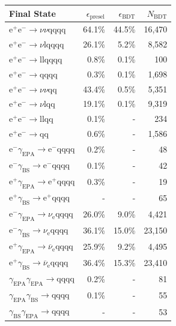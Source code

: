 \begin{table}[h!]
\centering
\begin{tabular}{ l r r r }
\hline
Final State & $\epsilon_{\text{presel}}$ & $\epsilon_{\text{BDT}}$ & $N_{\text{BDT}}$ \\ 
\hline
$\text{e}^{+}\text{e}^{-} \rightarrow \nu{\nu}\text{qqqq}$ & 64.1\% & 44.5\% & 16,470 \\
$\text{e}^{+}\text{e}^{-} \rightarrow \nu\text{lqqqq}$ & 26.1\% & 5.2\% & 8,582 \\
$\text{e}^{+}\text{e}^{-} \rightarrow \text{llqqqq}$ & 0.8\% & 0.1\% & 100 \\
$\text{e}^{+}\text{e}^{-} \rightarrow \text{qqqq}$ & 0.3\% & 0.1\% & 1,698 \\
$\text{e}^{+}\text{e}^{-} \rightarrow \nu{\nu}\text{qq}$ & 43.4\% & 0.5\% & 5,351 \\
$\text{e}^{+}\text{e}^{-} \rightarrow \nu\text{lqq}$ & 19.1\% & 0.1\% & 9,319 \\
$\text{e}^{+}\text{e}^{-} \rightarrow \text{llqq}$ & 0.1\% & - & 234 \\
$\text{e}^{+}\text{e}^{-} \rightarrow \text{qq}$ & 0.6\% & - & 1,586 \\
$\text{e}^{-}\gamma_{\text{EPA}} \rightarrow \text{e}^{-}\text{qqqq}$ & 0.2\% & - & 48 \\
$\text{e}^{-}\gamma_{\text{BS}} \rightarrow \text{e}^{-}\text{qqqq}$ & 0.1\% & - & 42 \\
$\text{e}^{+}\gamma_{\text{EPA}} \rightarrow \text{e}^{+}\text{qqqq}$ & 0.3\% & - & 19 \\
$\text{e}^{+}\gamma_{\text{BS}} \rightarrow \text{e}^{+}\text{qqqq}$ & - & - & 65 \\
$\text{e}^{-}\gamma_{\text{EPA}} \rightarrow \nu_{\text{e}}\text{qqqq}$ & 26.0\% & 9.0\% & 4,421 \\
$\text{e}^{-}\gamma_{\text{BS}} \rightarrow \nu_{\text{e}}\text{qqqq}$ & 36.1\% & 15.0\% & 23,150 \\
$\text{e}^{+}\gamma_{\text{EPA}} \rightarrow \overline{\nu}_{\text{e}}\text{qqqq}$ & 25.9\% & 9.2\% & 4,495 \\
$\text{e}^{+}\gamma_{\text{BS}} \rightarrow \overline{\nu}_{\text{e}}\text{qqqq}$ & 36.4\% & 15.3\% & 23,410 \\
$\gamma_{\text{EPA}}\gamma_{\text{EPA}} \rightarrow \text{qqqq}$ & 0.2\% & - & 81 \\
$\gamma_{\text{EPA}}\gamma_{\text{BS}} \rightarrow \text{qqqq}$ & 0.1\% & - & 55 \\
$\gamma_{\text{BS}}\gamma_{\text{EPA}} \rightarrow \text{qqqq}$ & - & - & 53 \\

\end{tabular}
\end{table}

